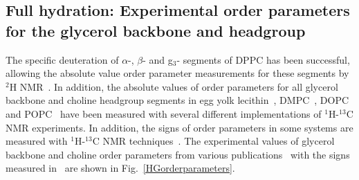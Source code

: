 \documentclass[journal=jacsat,manuscript=article]{achemso}
\begin{document}
\subsection{Full hydration: Experimental order parameters for the glycerol backbone and headgroup}\label{experiments}
The specific deuteration of $\alpha$-, $\beta$- and g$_3$- segments of DPPC has been successful, 
allowing the absolute value order parameter measurements for these segments by $^2$H NMR~\cite{gally75,brown77,brown78,akutsu81}.
In addition, the absolute values of order parameters for all glycerol backbone and choline headgroup segments in egg yolk lecithin~\cite{hong95a},
DMPC~\cite{hong95b,gross97,dvinskikh05a}, DOPC~\cite{warschawski05} and POPC~\cite{warschawski05,ferreira13}
have been measured with several different implementations of $^1$H-$^{13}$C NMR experiments. In addition, the signs of order parameters in some systems
are measured with $^1$H-$^{13}$C NMR techniques~\cite{hong95a,hong95b,gross97}. The experimental values of glycerol backbone 
and choline order parameters from various publications~\cite{gally75,akutsu81,gross97,dvinskikh05a,ferreira13} with the signs measured in~\cite{hong95a,hong95b,gross97} are shown in Fig.~\ref{HGorderparameters}.
\end{document}
